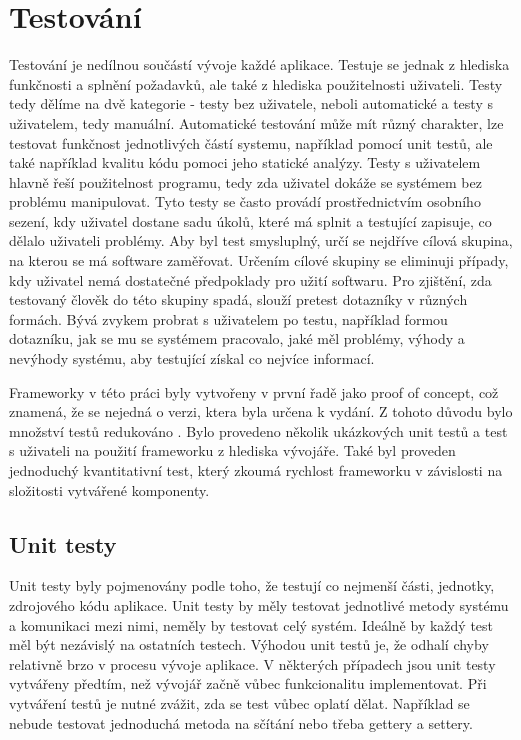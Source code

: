 \chapter{Testování} 
Testování je nedílnou součástí vývoje každé aplikace. Testuje se jednak z hlediska funkčnosti a splnění požadavků, ale také z hlediska použitelnosti uživateli. Testy tedy dělíme na dvě kategorie - testy bez uživatele, neboli automatické a testy s uživatelem, tedy manuální.  Automatické testování může mít různý charakter, lze testovat funkčnost jednotlivých částí systemu, například pomocí unit testů, ale také například kvalitu kódu pomoci jeho statické analýzy. Testy s uživatelem hlavně řeší použitelnost programu, tedy zda uživatel dokáže se systémem bez problému manipulovat. Tyto testy se často provádí prostřednictvím osobního sezení, kdy uživatel dostane sadu úkolů, které má splnit a testující zapisuje, co dělalo uživateli problémy. Aby byl test smysluplný, určí se nejdříve cílová skupina, na kterou se má software zaměřovat. Určením cílové skupiny se eliminuji případy, kdy uživatel nemá dostatečné předpoklady pro užití softwaru. Pro zjištění, zda testovaný člověk do této skupiny spadá, slouží pretest dotazníky v různých formách. Bývá zvykem probrat s uživatelem po testu, například formou dotazníku, jak se mu se systémem pracovalo, jaké měl problémy, výhody a nevýhody systému, aby testující získal co nejvíce informací.  

Frameworky v této práci byly vytvořeny v první řadě jako proof of concept, což znamená, že se nejedná o verzi, ktera byla určena k vydání. Z tohoto důvodu bylo množství testů redukováno . Bylo provedeno několik ukázkových unit testů a test s uživateli na použití frameworku z hlediska vývojáře. Také byl proveden jednoduchý kvantitativní test, který zkoumá rychlost frameworku v závislosti na složitosti vytvářené komponenty.

\section{Unit testy} 
Unit testy byly pojmenovány podle toho, že testují co nejmenší části, jednotky, zdrojového kódu aplikace. Unit testy by měly testovat jednotlivé metody systému a komunikaci mezi nimi, neměly by testovat celý systém. Ideálně by každý test měl být nezávislý na ostatních testech. Výhodou unit testů je, že odhalí chyby relativně brzo v procesu vývoje aplikace. V některých případech jsou unit testy vytvářeny předtím, než vývojář začně vůbec funkcionalitu implementovat. Při vytváření testů je nutné zvážit, zda se test vůbec oplatí dělat. Například se nebude testovat jednoduchá metoda na sčítání nebo třeba gettery a settery.

